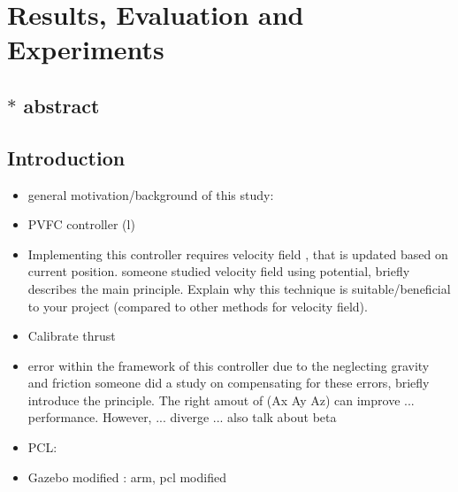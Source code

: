 \section{Results, Evaluation and Experiments}
\subsection{$\ast$ abstract}
\subsection{Introduction}
 \begin{itemize}
    \item general motivation/background of this study: 
    \item PVFC controller (l)
    \item Implementing this controller requires velocity field , that is updated based on current position.
          someone studied velocity field using potential, briefly describes the main principle. 
           Explain why this technique is suitable/beneficial to your project (compared to other methods for velocity field).
    \item Calibrate thrust
    \item  error within the framework of this controller due to the neglecting gravity and friction
          someone did a study on compensating for these errors, briefly introduce the principle. The right amout of (Ax Ay Az) 
          can improve ... performance. However, ... diverge ... also talk about  beta 
    \item PCL: 
    \item Gazebo modified : arm, pcl modified
 \end{itemize}

